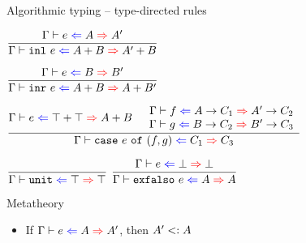 \documentclass{beamer}
\begin{document}
\begin{frame}{Algorithmic typing -- type-directed rules}

\begin{center}
  $\infrule{\hinting{e}{A}{A'}}{\hinting{\inl{e}}{\Sum{A}{B}}{\Sum{A'}{B}}}$

  \vspace{2em}

  $\infrule{\hinting{e}{B}{B'}}{\hinting{\inr{e}}{\Sum{A}{B}}{\Sum{A}{B'}}}$

  \vspace{2em}

  $\infrule{\hinting{e}{\Sum{\Top}{\Top}}{\Sum{A}{B}} \quad \begin{array}{c} \hinting{f}{\Fun{A}{C_1}}{\Fun{A'}{C_2}} \\ \hinting{g}{\Fun{B}{C_2}}{\Fun{B'}{C_3}} \end{array}}{\hinting{\case{e}{f}{g}}{C_1}{C_3}}$

  \vspace{2em}

  $\infrule{}{\hinting{\unit}{\Top}{\Top}}$ \quad
  $\infrule{\hinting{e}{\Bot}{\Bot}}{\hinting{\exfalso{e}}{A}{A}}$
\end{center}

\end{frame}

\begin{frame}{Metatheory}

\begin{itemize}
  \item If $\hinting{e}{A}{A'}$, then $A' <: A$
\end{itemize}

\end{frame}
\end{document}
